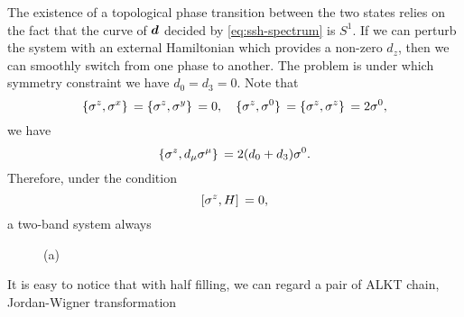 \documentclass[hyperref, a4paper]{article}
\begin{document}
The existence of a topological phase transition between the two states relies on the fact that the curve of 
$\vb*{d}$ decided by \eqref{eq:ssh-spectrum} is $S^1$. If we can perturb the system with an external Hamiltonian
which provides a non-zero $d_z$, then we can smoothly switch from one phase to another. 
The problem is under which symmetry constraint we have $d_0 = d_3 = 0$. Note that 
\[
    \acomm*{\sigma^z}{\sigma^x} = \acomm*{\sigma^z}{\sigma^y} = 0, \quad 
    \acomm*{\sigma^z}{\sigma^0} = \acomm*{\sigma^z}{\sigma^z} = 2 \sigma^0,
\]
we have 
\begin{equation}
    \acomm*{\sigma^z}{d_\mu \sigma^\mu} = 2 (d_0 + d_3) \sigma^0 .
\end{equation}
Therefore, under the condition 
\begin{equation}
    \comm*{\sigma^z}{H} = 0,
\end{equation}
a two-band system always

\begin{figure}
    \centering
    \begin{subfigure}{0.8\textwidth}
        \centering
        
        \subcaption{}
        \label{fig:ssh-trivial}
    \end{subfigure}    
    \vspace{1em}
    \begin{subfigure}{0.8\textwidth}
        \centering
        
        \subcaption{}
        \label{fig:ssh-edge}
    \end{subfigure}
    \caption{(a)}
\end{figure}

It is easy to notice that with half filling, we can regard a pair of 
ALKT chain, Jordan-Wigner transformation



\end{document}
